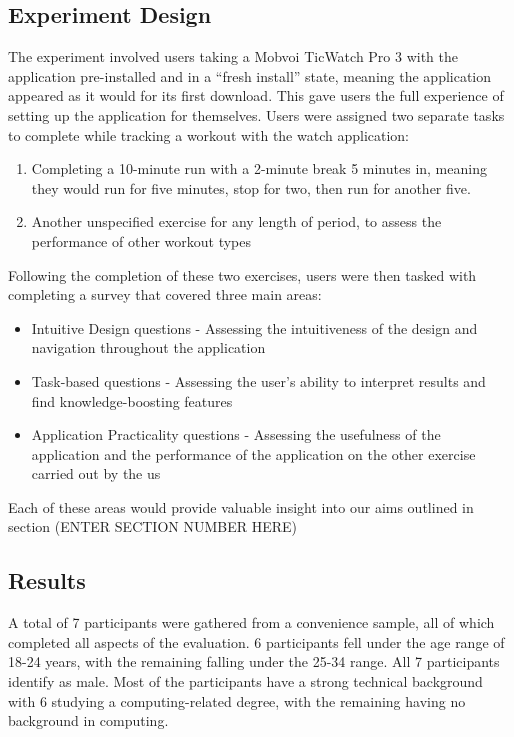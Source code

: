 \documentclass{l4proj}
\begin{document}
\subsection{Experiment Design}

The experiment involved users taking a Mobvoi TicWatch Pro 3 with the application pre-installed and in a “fresh install” state, meaning the application appeared as it would for its first download. This gave users the full experience of setting up the application for themselves. Users were assigned two separate tasks to complete while tracking a workout with the watch application:

\begin{enumerate}
    \item Completing a 10-minute run with a 2-minute break 5 minutes in, meaning they would run for five minutes, stop for two, then run for another five.
    \item Another unspecified exercise for any length of period, to assess the performance of other workout types
\end{enumerate}
Following the completion of these two exercises, users were then tasked with completing a survey that covered three main areas:

\begin{itemize}
    \item Intuitive Design questions - Assessing the intuitiveness of the design and navigation throughout the application
    \item Task-based questions - Assessing the user’s ability to interpret results and find knowledge-boosting features
    \item Application Practicality questions - Assessing the usefulness of the application and the performance of the application on the other exercise carried out by the us
\end{itemize}

Each of these areas would provide valuable insight into our aims outlined in section (ENTER SECTION NUMBER HERE)

\subsection{Results}

A total of 7 participants were gathered from a convenience sample, all of which completed all aspects of the evaluation. 6 participants fell under the age range of 18-24 years, with the remaining falling under the 25-34 range. All 7 participants identify as male. Most of the participants have a strong technical background with 6 studying a computing-related degree, with the remaining having no background in computing.
\end{document}
